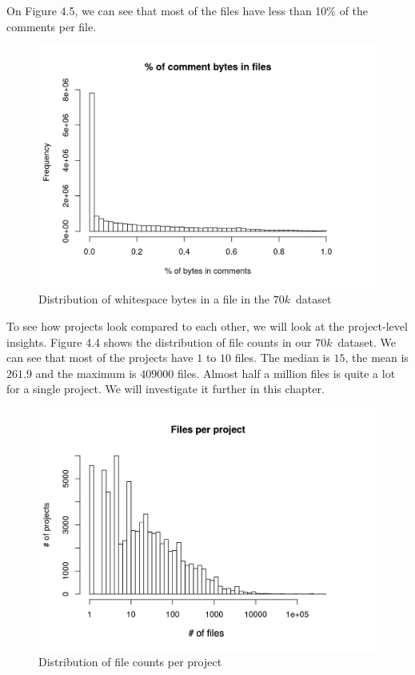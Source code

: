 \documentclass[thesis=M,english]{FITthesis}[2012/10/20]
\begin{document}
On Figure 4.5, we can see that most of the files have less than 10\% of the comments per file.

\begin{center}
\begin{figure}[h!]
	\includegraphics[totalheight=230pt]{images/70k_comments.png}
	\caption{Distribution of whitespace bytes in a file in the $70k$ dataset}
	\label{fig: 70k_comments}
\end{figure}
\end{center}


To see how projects look compared to each other, we will look at the project-level insights. Figure 4.4 shows the distribution of file counts in our $70k$ dataset. We can see that most of the projects have $1$ to $10$ files. The median is $15$, the mean is $261.9$ and the maximum is $409000$ files. Almost half a million files is quite a lot for a single project. We will investigate it further in this chapter. \\

\begin{center}
\begin{figure}[h!]
	\includegraphics[totalheight=270pt]{images/70k_filespp.png}
	\caption{Distribution of file counts per project}
	\label{fig: 70k_filespp}
\end{figure}
\end{center}
\end{document}
